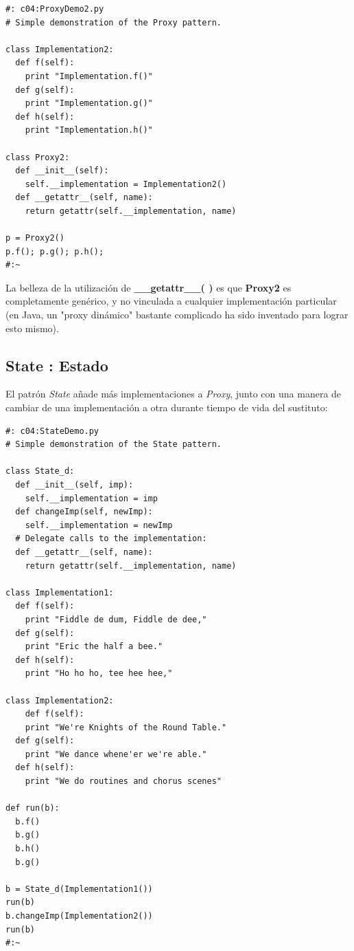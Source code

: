 \documentclass{article}
\begin{document}
\begin{lstlisting} 
#: c04:ProxyDemo2.py 
# Simple demonstration of the Proxy pattern. 

class Implementation2: 
  def f(self):  
    print "Implementation.f()" 
  def g(self):  
    print "Implementation.g()"  
  def h(self):  
    print "Implementation.h()" 
    
class Proxy2: 
  def __init__(self):  
    self.__implementation = Implementation2()  
  def __getattr__(self, name): 
    return getattr(self.__implementation, name) 
    
p = Proxy2() 
p.f(); p.g(); p.h(); 
#:~ 
\end{lstlisting}
La belleza de la utilización de  \textbf{\_\_getattr\_\_( )} es que \textbf{Proxy2} es completamente genérico, y no vinculada a cualquier implementación particular (en Java, un "proxy dinámico" bastante complicado ha sido inventado para lograr esto mismo). 

\newpage

\subsection{State : Estado}

El patrón \textit{State} añade más implementaciones a \textit{Proxy}, junto con una manera de cambiar de una implementación a otra durante tiempo de vida del sustituto: \newline

\begin{lstlisting} 
#: c04:StateDemo.py 
# Simple demonstration of the State pattern.

class State_d: 
  def __init__(self, imp):  
    self.__implementation = imp  
  def changeImp(self, newImp): 
    self.__implementation = newImp 
  # Delegate calls to the implementation: 
  def __getattr__(self, name): 
    return getattr(self.__implementation, name) 
    
class Implementation1: 
  def f(self):  
    print "Fiddle de dum, Fiddle de dee,"  
  def g(self):  
    print "Eric the half a bee."  
  def h(self):  
    print "Ho ho ho, tee hee hee,"  
    
class Implementation2: 
    def f(self):  
    print "We're Knights of the Round Table."  
  def g(self):  
    print "We dance whene'er we're able."  
  def h(self):  
    print "We do routines and chorus scenes"  
    
def run(b): 
  b.f() 
  b.g() 
  b.h() 
  b.g() 
  
b = State_d(Implementation1()) 
run(b) 
b.changeImp(Implementation2()) 
run(b) 
#:~ 
\end{lstlisting}
\end{document}
